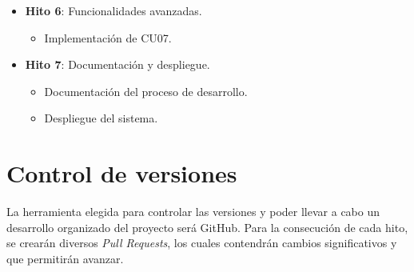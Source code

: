 \begin{itemize}
	\item \textbf{Hito 6}: Funcionalidades avanzadas.
	\begin{itemize}
		\item Implementación de CU07.
	\end{itemize}

	\item \textbf{Hito 7}: Documentación y despliegue.
	\begin{itemize}
		\item Documentación del proceso de desarrollo.
		\item Despliegue del sistema.
	\end{itemize}
\end{itemize}


\section{Control de versiones}
La herramienta elegida para controlar las versiones y poder llevar a cabo un desarrollo organizado del proyecto será GitHub. Para la consecución de cada hito, se crearán diversos \textit{Pull Requests}, los cuales contendrán cambios significativos y que permitirán avanzar. 

